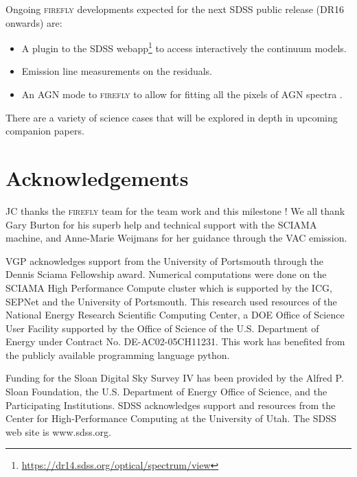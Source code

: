 \documentclass[onecolumn]{aa}
\begin{document}
Ongoing \textsc{firefly} developments expected for the next SDSS public release (DR16 onwards) are:
\begin{itemize}
\item A plugin to the SDSS webapp\footnote{\url{https://dr14.sdss.org/optical/spectrum/view}} to access interactively the continuum models.
\item Emission line measurements on the residuals.
\item An AGN mode to \textsc{firefly} to allow for fitting all the pixels of AGN spectra \citep[e.g.][]{2017MNRAS.472.4051C}.
\end{itemize}

There are a variety of science cases that will be explored in depth in upcoming companion papers. 
 
\section{Acknowledgements}
JC thanks the \textsc{firefly} team for the team work and this milestone ! 
We all thank Gary Burton for his superb help and technical support with the SCIAMA machine, and Anne-Marie Weijmans for her guidance through the VAC emission.

VGP acknowledges support from the University of Portsmouth through the Dennis Sciama Fellowship award. 
Numerical computations were done on the SCIAMA High Performance Compute cluster which is supported by the ICG, SEPNet and the University of Portsmouth. 
This research used resources of the National Energy Research Scientific Computing Center, a DOE Office of Science User Facility supported by the Office of Science of the U.S. 
Department of Energy under Contract No. DE-AC02-05CH11231. 
This work has benefited from the publicly available programming language {\sc python}.

Funding for the Sloan Digital Sky Survey IV has been provided by the Alfred P. Sloan Foundation, the U.S. Department of Energy Office of Science, and the Participating Institutions. SDSS acknowledges support and resources from the Center for High-Performance Computing at the University of Utah. The SDSS web site is www.sdss.org.
\end{document}
